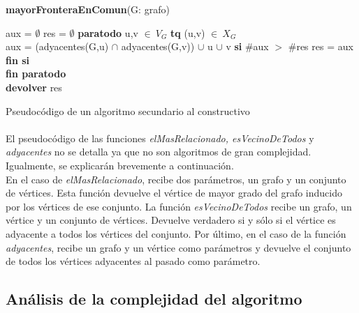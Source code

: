 \vspace{3em}

\textbf{mayorFronteraEnComun}(G: grafo) \\
\begin{algorithm}[H]
	\BlankLine
	aux = $\emptyset$
	res = $\emptyset$
	\textbf{paratodo} u,v $\in\ V_{G}$ \textbf{tq} (u,v) $\in\ X_{G}$ \\
		\tab aux = (adyacentes(G,u) $\cap$ adyacentes(G,v)) $\cup$ u $\cup$ v
		\tab \textbf{si} \#aux $>$ \#res
			\tab \tab res = aux
		\tab \textbf{fin si}\\
	\textbf{fin paratodo}\\

	\textbf{devolver} res

\caption{Pseudocódigo de un algoritmo secundario al constructivo}
\end{algorithm}


\normalsize

\paragraph{}
El pseudocódigo de las funciones \textit{elMasRelacionado, esVecinoDeTodos} y \textit{adyacentes} no se detalla ya que no son algoritmos de gran complejidad. Igualmente, se explicarán brevemente a continuación.\\
En el caso de \textit{elMasRelacionado}, recibe dos parámetros, un grafo y un conjunto de vértices. Esta función devuelve el vértice de mayor grado del grafo inducido por los vértices de ese conjunto. La función \textit{esVecinoDeTodos} recibe un grafo, un vértice y un conjunto de vértices. Devuelve verdadero si y sólo si el vértice es adyacente a todos los vértices del conjunto. Por último, en el caso de la función \textit{adyacentes}, recibe un grafo y un vértice como parámetros y devuelve el conjunto de todos los vértices adyacentes al pasado como parámetro.


\subsection{Análisis de la complejidad del algoritmo}
\label{complejidad3}
